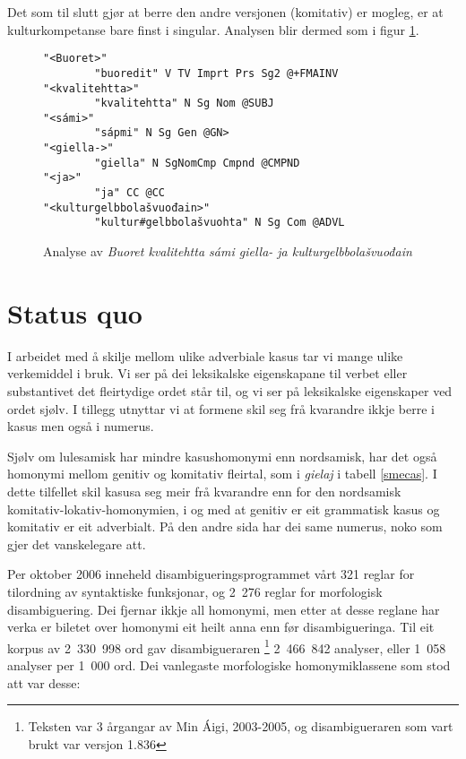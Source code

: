 \documentclass[a4paper,norsk]{article}
\begin{document}
Det som til slutt gjør at berre den andre versjonen (komitativ) er mogleg, er  at kulturkompetanse bare finst i singular. Analysen blir dermed som i figur \ref{kvalianalyse}.%


\begin{figure}[htbp]
\begin{center}
\begin{verbatim}
"<Buoret>"
        "buoredit" V TV Imprt Prs Sg2 @+FMAINV
"<kvalitehtta>"
        "kvalitehtta" N Sg Nom @SUBJ
"<sámi>"
        "sápmi" N Sg Gen @GN>
"<giella->"
        "giella" N SgNomCmp Cmpnd @CMPND
"<ja>"
        "ja" CC @CC
"<kulturgelbbolašvuođain>"
        "kultur#gelbbolašvuohta" N Sg Com @ADVL
\end{verbatim}
\caption{Analyse av \textit{Buoret kvalitehtta sámi giella- ja kulturgelbbolašvuođain}}
\label{kvalianalyse}
\end{center}
\end{figure}


\section{Status quo}

I arbeidet med å skilje mellom ulike adverbiale kasus tar vi mange ulike verkemiddel i bruk. Vi ser på dei leksikalske eigenskapane til verbet eller substantivet det fleirtydige ordet står til, og vi ser på leksikalske eigenskaper ved ordet sjølv. I tillegg utnyttar vi at formene skil seg frå kvarandre ikkje berre i kasus men også i numerus. %

Sjølv om lulesamisk har mindre kasushomonymi enn nordsamisk, har det også homonymi mellom genitiv og komitativ fleirtal, som i \textit{gielaj} i tabell \ref{smecas}. I dette tilfellet skil kasusa seg meir frå kvarandre enn for den nordsamisk komitativ-lokativ-homonymien, i og med at genitiv er eit grammatisk kasus og komitativ er eit adverbialt. På den andre sida har dei same numerus, noko som gjer det vanskelegare att. %

Per oktober 2006 inneheld disambigueringsprogrammet vårt 321 reglar for tilordning av syntaktiske funksjonar, og 2\ 276 reglar for morfologisk disambiguering. Dei fjernar ikkje all homonymi, men etter at desse reglane har verka er biletet over homonymi eit heilt anna enn før disambigueringa. Til eit korpus av 2\ 330\ 998 ord gav disambigueraren \footnote{Teksten var 3 årgangar av Min Áigi, 2003-2005, og disambigueraren som vart brukt var versjon 1.836} 2\ 466\ 842 analyser, eller 1\ 058 analyser per 1\ 000 ord. Dei vanlegaste morfologiske homonymiklassene som stod att var desse: %
\end{document}
